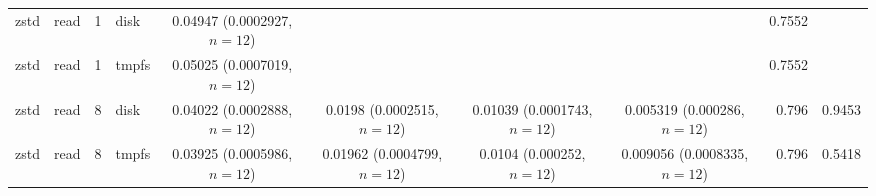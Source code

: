 \begin{table}[tbp]
{\begin{tabular}{@{}llrl cccc rr@{}}
zstd & read & 1 & disk & 0.04947 (0.0002927, $n{=}12$) &  &  &  & 0.7552 &  \\
zstd & read & 1 & tmpfs & 0.05025 (0.0007019, $n{=}12$) &  &  &  & 0.7552 &  \\
zstd & read & 8 & disk & 0.04022 (0.0002888, $n{=}12$) & 0.0198 (0.0002515, $n{=}12$) & 0.01039 (0.0001743, $n{=}12$) & 0.005319 (0.000286, $n{=}12$) & 0.796 & 0.9453 \\
zstd & read & 8 & tmpfs & 0.03925 (0.0005986, $n{=}12$) & 0.01962 (0.0004799, $n{=}12$) & 0.0104 (0.000252, $n{=}12$) & 0.009056 (0.0008335, $n{=}12$) & 0.796 & 0.5418 \\
\bottomrule
\end{tabular}
}
\end{table}
\FloatBarrier

\begin{table}[tbp]
\centering
\scriptsize
\caption{CON-bin of the million-atom frame. The write unlinks the destination before the clock. Time is the type-7 median in seconds, the interquartile range, and $n$. The 8-way column is $(t(1)/t(8))/8$ when this record has thread counts 1, 2, 4 and 8. Host from lscpu: Intel(R) Xeon(R) Processor, family 6, model 173, 8 CPUs. Disk rows use ext2/ext3. Memory rows use tmpfs (/dev/shm). }
\label{tab:camp22-conbin}
\end{table}
\FloatBarrier
